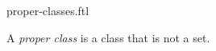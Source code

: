 \documentclass{stex}
\begin{document}
\begin{smodule}{proper-classes.ftl}



\begin{definition*}[forthel,for=proper class]
  A \emph{proper class} is a class that is not a set.
\end{definition*}

\end{smodule}
\end{document}
